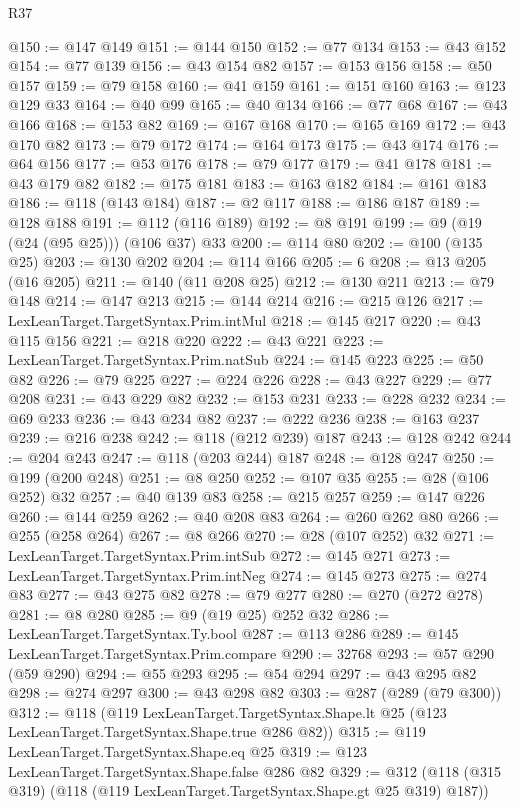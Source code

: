 \begin{lexlean}{R37}
\begin{coremodule}
@150 := @147 @149
@151 := @144 @150
@152 := @77 @134
@153 := @43 @152
@154 := @77 @139
@156 := @43 @154 @82
@157 := @153 @156
@158 := @50 @157
@159 := @79 @158
@160 := @41 @159
@161 := @151 @160
@163 := @123 @129 @33
@164 := @40 @99
@165 := @40 @134
@166 := @77 @68
@167 := @43 @166
@168 := @153 @82
@169 := @167 @168
@170 := @165 @169
@172 := @43 @170 @82
@173 := @79 @172
@174 := @164 @173
@175 := @43 @174
@176 := @64 @156
@177 := @53 @176
@178 := @79 @177
@179 := @41 @178
@181 := @43 @179 @82
@182 := @175 @181
@183 := @163 @182
@184 := @161 @183
@186 := @118 (@143 @184)
@187 := @2 @117
@188 := @186 @187
@189 := @128 @188
@191 := @112 (@116 @189)
@192 := @8 @191
@199 := @9 (@19 (@24 (@95 @25))) (@106 @37) @33
@200 := @114 @80
@202 := @100 (@135 @25)
@203 := @130 @202
@204 := @114 @166
@205 := 6
@208 := @13 @205 (@16 @205)
@211 := @140 (@11 @208 @25)
@212 := @130 @211
@213 := @79 @148
@214 := @147 @213
@215 := @144 @214
@216 := @215 @126
@217 := LexLeanTarget.TargetSyntax.Prim.intMul
@218 := @145 @217
@220 := @43 @115 @156
@221 := @218 @220
@222 := @43 @221
@223 := LexLeanTarget.TargetSyntax.Prim.natSub
@224 := @145 @223
@225 := @50 @82
@226 := @79 @225
@227 := @224 @226
@228 := @43 @227
@229 := @77 @208
@231 := @43 @229 @82
@232 := @153 @231
@233 := @228 @232
@234 := @69 @233
@236 := @43 @234 @82
@237 := @222 @236
@238 := @163 @237
@239 := @216 @238
@242 := @118 (@212 @239) @187
@243 := @128 @242
@244 := @204 @243
@247 := @118 (@203 @244) @187
@248 := @128 @247
@250 := @199 (@200 @248)
@251 := @8 @250
@252 := @107 @35
@255 := @28 (@106 @252) @32
@257 := @40 @139 @83
@258 := @215 @257
@259 := @147 @226
@260 := @144 @259
@262 := @40 @208 @83
@264 := @260 @262 @80
@266 := @255 (@258 @264)
@267 := @8 @266
@270 := @28 (@107 @252) @32
@271 := LexLeanTarget.TargetSyntax.Prim.intSub
@272 := @145 @271
@273 := LexLeanTarget.TargetSyntax.Prim.intNeg
@274 := @145 @273
@275 := @274 @83
@277 := @43 @275 @82
@278 := @79 @277
@280 := @270 (@272 @278)
@281 := @8 @280
@285 := @9 (@19 @25) @252 @32
@286 := LexLeanTarget.TargetSyntax.Ty.bool
@287 := @113 @286
@289 := @145 LexLeanTarget.TargetSyntax.Prim.compare
@290 := 32768
@293 := @57 @290 (@59 @290)
@294 := @55 @293
@295 := @54 @294
@297 := @43 @295 @82
@298 := @274 @297
@300 := @43 @298 @82
@303 := @287 (@289 (@79 @300))
@312 := @118
    (@119
      LexLeanTarget.TargetSyntax.Shape.lt
      @25
      (@123 LexLeanTarget.TargetSyntax.Shape.true @286 @82))
@315 := @119 LexLeanTarget.TargetSyntax.Shape.eq @25
@319 := @123 LexLeanTarget.TargetSyntax.Shape.false @286 @82
@329 := @312 (@118 (@315 @319) (@118 (@119 LexLeanTarget.TargetSyntax.Shape.gt @25 @319) @187))

\end{coremodule}
\end{lexlean}
